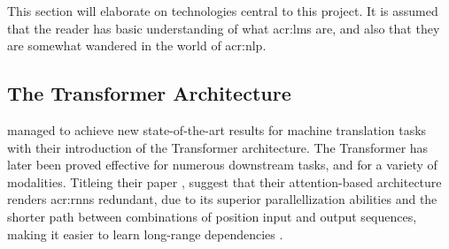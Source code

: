 This section will elaborate on technologies central to this project. It is assumed that the reader has basic understanding of what \glspl{acr:lm} are, and also that they are somewhat wandered in the world of \acrfull{acr:nlp}.

\subsection{The Transformer Architecture}

\cite{vaswaniAttentionAllYou2017a} managed to achieve new state-of-the-art results for machine translation tasks with their introduction of the Transformer architecture. The Transformer has later been proved effective for numerous downstream tasks, and for a variety of modalities. Titleing their paper , \citeauthor{vaswaniAttentionAllYou2017a} suggest that their attention-based architecture renders \glspl{acr:rnn}  redundant, due to its superior parallellization abilities and the shorter path between combinations of position input and output sequences, making it easier to learn long-range dependencies \citep[6]{vaswaniAttentionAllYou2017a}.


